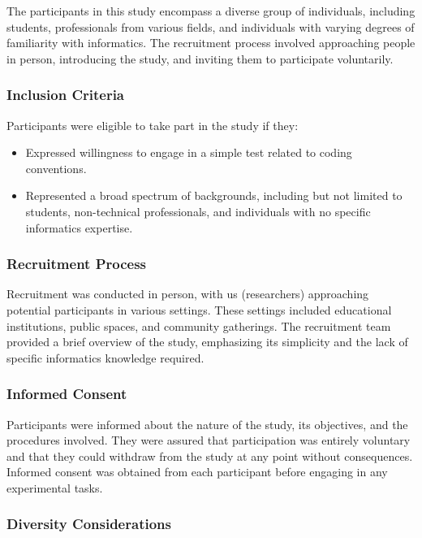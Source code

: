 \documentclass{article}
\begin{document}
The participants in this study encompass a diverse group of individuals, including students, professionals from various fields, and individuals with varying degrees of familiarity with informatics. The recruitment process involved approaching people in person, introducing the study, and inviting them to participate voluntarily.

\subsubsection*{Inclusion Criteria}

Participants were eligible to take part in the study if they:
\begin{itemize}
  \item Expressed willingness to engage in a simple test related to coding conventions.
  \item Represented a broad spectrum of backgrounds, including but not limited to students, non-technical professionals, and individuals with no specific informatics expertise.
\end{itemize}

\subsubsection*{Recruitment Process}

Recruitment was conducted in person, with us (researchers) approaching potential participants in various settings. These settings included educational institutions, public spaces, and community gatherings. The recruitment team provided a brief overview of the study, emphasizing its simplicity and the lack of specific informatics knowledge required.

\subsubsection*{Informed Consent}

Participants were informed about the nature of the study, its objectives, and the procedures involved. They were assured that participation was entirely voluntary and that they could withdraw from the study at any point without consequences. Informed consent was obtained from each participant before engaging in any experimental tasks.

\subsubsection*{Diversity Considerations}
\end{document}
